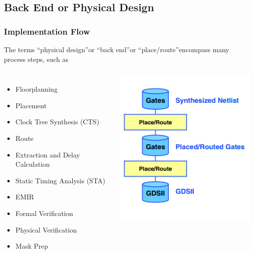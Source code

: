\documentclass[compress]{beamer}
\begin{document}
\subsection[Physical Design]{Back End or Physical Design}
\begin{frame}
	\frametitle{Implementation Flow}
The terms “physical design”or “back end”or “place/route”encompass many process steps, such as
	\begin{columns}	
		\column{1\textheight}
		\begin{itemize}
			\item Floorplanning
			\item Placement
			\item Clock Tree Synthesis (CTS)
			\item Route
			\item Extraction and Delay Calculation
			\item Static Timing Analysis (STA)
			\item EMIR
			\item Formal Verification
			\item Physical Verification
			\item Mask Prep 
		\end{itemize}
		\column{0.4\textheight}
		\begin{center}
			\includegraphics[width= 0.4\textheight]{simple}
		\end{center}
	\end{columns}
\end{frame}	
\end{document}
